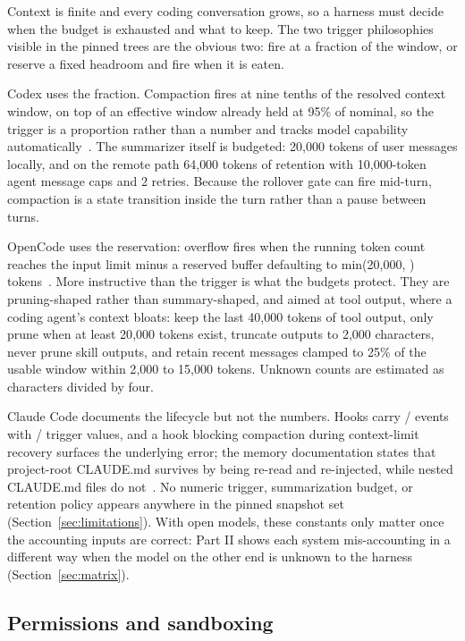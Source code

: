 \documentclass{article}
\newcommand{\codex}[0]{Codex}
\newcommand{\occ}[0]{OpenCode}
\newcommand{\ccc}[0]{Claude Code}
\begin{document}
Context is finite and every coding conversation grows, so a harness must
decide when the budget is exhausted and what to keep. The two trigger
philosophies visible in the pinned trees are the obvious two: fire at a
fraction of the window, or reserve a fixed headroom and fire when it is
eaten.

\codex{} uses the fraction. Compaction fires at nine tenths of the
resolved context window, on top of an effective window already held at
95\% of nominal, so the trigger is a proportion rather than a number and
tracks model capability automatically~\citep{codexRepo}. The summarizer
itself is budgeted: 20{,}000 tokens of user messages locally, and on the
remote path 64{,}000 tokens of retention with 10{,}000-token agent
message caps and 2 retries. Because the rollover gate can fire mid-turn,
compaction is a state transition inside the turn rather than a pause
between turns.

\occ{} uses the reservation: overflow fires when the running token count
reaches the input limit minus a reserved buffer defaulting to
min(20{,}000, )
tokens~\citep{opencodeRepo}. More instructive than the trigger is what
the budgets protect. They are pruning-shaped rather than summary-shaped,
and aimed at tool output, where a coding agent's context bloats:
keep the last 40{,}000 tokens of tool output, only prune when at least
20{,}000 tokens exist, truncate outputs to 2{,}000 characters, never prune
skill outputs, and retain recent messages clamped to 25\% of the usable
window within 2{,}000 to 15{,}000 tokens. Unknown counts are estimated
as characters divided by four.

\ccc{} documents the lifecycle but not the numbers. Hooks carry
/ events with /
trigger values, and a hook blocking compaction during context-limit
recovery surfaces the underlying error; the memory documentation states
that project-root CLAUDE.md survives  by being re-read and
re-injected, while nested CLAUDE.md files do
not~\citep{claudeCodeDocsHooks,claudeCodeDocsMemory}. No numeric trigger,
summarization budget, or retention policy appears anywhere in the pinned
snapshot set (Section~\ref{sec:limitations}). With open models, these
constants only matter once the accounting inputs are correct: Part II
shows each system mis-accounting in a different way when the model on the
other end is unknown to the harness
(Section~\ref{sec:matrix}).

\subsection{Permissions and sandboxing}
\label{sec:safety}
\end{document}
